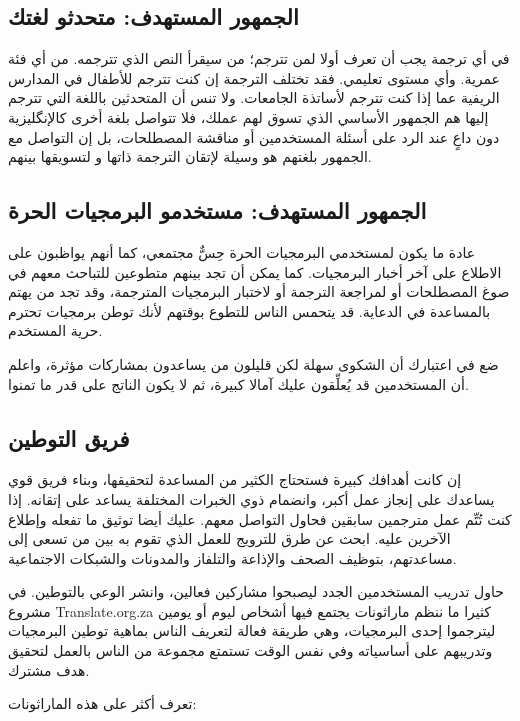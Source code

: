 \subsection{الجمهور المستهدف: متحدثو لغتك}
في أي ترجمة يجب أن تعرف أولا لمن تترجم؛ من سيقرأ النص الذي تترجمه. من أي
فئة عمرية. وأي مستوى تعليمي. فقد تختلف الترجمة إن كنت تترجم للأطفال في
المدارس الريفية عما إذا كنت تترجم لأساتذة الجامعات. ولا تنس أن
المتحدثين باللغة التي تترجم إليها هم الجمهور الأساسي الذي تسوق لهم
عملك، فلا تتواصل بلغة أخرى كالإنگليزية دون داعٍ عند الرد على أسئلة
المستخدمين أو مناقشة المصطلحات، بل إن التواصل مع الجمهور بلغتهم هو
وسيلة لإتقان الترجمة ذاتها و لتسويقها بينهم.

\subsection{الجمهور المستهدف: مستخدمو البرمجيات الحرة}
عادة ما يكون لمستخدمي البرمجيات الحرة حِسٌّ مجتمعي، كما أنهم يواظبون على
الاطلاع على آخر أخبار البرمجيات. كما يمكن أن تجد بينهم متطوعين للتباحث
معهم في صوغ المصطلحات أو لمراجعة الترجمة أو لاختبار البرمجيات المترجمة،
وقد تجد من يهتم بالمساعدة في الدعاية. قد يتحمس الناس للتطوع بوقتهم لأنك
توطن برمجيات تحترم حرية المستخدم.

ضع في اعتبارك أن الشكوى سهلة لكن قليلون من يساعدون بمشاركات مؤثرة، واعلم
أن المستخدمين قد يُعلِّقون عليك آمالا كبيرة، ثم لا يكون الناتج على قدر
ما تمنوا.

\subsection{فريق التوطين}
إن كانت أهدافك كبيرة فستحتاج الكثير من المساعدة لتحقيقها، وبناء فريق قوي
يساعدك على إنجاز عمل أكبر، وانضمام ذوي الخبرات المختلفة يساعد على
إتقانه. إذا كنت تُتِّم عمل مترجمين سابقين فحاول التواصل معهم. عليك أيضا
توثيق ما تفعله وإطلاع الآخرين عليه. ابحث عن طرق للترويج للعمل الذي تقوم
به بين من تسعى إلى مساعدتهم، بتوظيف الصحف والإذاعة والتلفاز والمدونات
والشبكات الاجتماعية.

حاول تدريب المستخدمين الجدد ليصبحوا مشاركين فعالين، وانشر الوعي
بالتوطين. في مشروع Translate.org.za كثيرا ما ننظم ماراثونات يجتمع فيها
أشخاص ليوم أو يومين ليترجموا إحدى البرمجيات، وهي طريقة فعالة لتعريف
الناس بماهية توطين البرمجيات وتدريبهم على أساسياته وفي نفس الوقت تستمتع
مجموعة من الناس بالعمل لتحقيق هدف مشترك.

تعرف أكثر على هذه الماراثونات:


